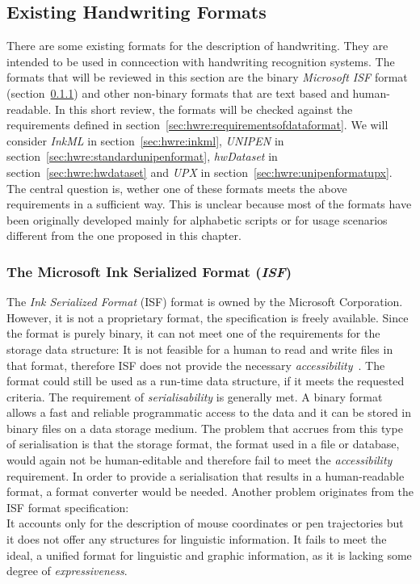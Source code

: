 

\subsection{Existing Handwriting Formats}
\label{sec:hwre:existingformats}

There are some existing formats for the description of handwriting.
They are intended to be used in conncection with handwriting recognition systems.
The formats that will be reviewed in this section are the 
binary \emph{Microsoft ISF} format (section~\ref{sec:hwre:msisfformat})
and other non-binary formats that are text based and human-readable.
In this short review, the formats will be checked against the 
requirements defined in section~\ref{sec:hwre:requirementsofdataformat}. 
We will consider 
\emph{InkML} in section~\ref{sec:hwre:inkml}, 
\emph{UNIPEN} in section~\ref{sec:hwre:standardunipenformat}, 
\emph{hwDataset} in section~\ref{sec:hwre:hwdataset} and 
\emph{UPX} in section~\ref{sec:hwre:unipenformatupx}.
The central question is, wether one of these formats meets the above requirements in 
a sufficient way. This is unclear because most of the formats have been 
originally developed mainly for alphabetic scripts or for usage scenarios 
different from the one proposed in this chapter.

\subsubsection{The Microsoft Ink Serialized Format (\emph{ISF})}
\label{sec:hwre:msisfformat}

The \emph{Ink Serialized Format} (ISF) format is owned by the 
Microsoft Corporation. However, it is not a proprietary format, the 
specification is freely available. Since the format is purely binary, 
it can not meet one of the requirements for the storage data structure:
It is not feasible for a human to read and write files in that format,
therefore ISF does not provide the necessary 
\emph{accessibility}~. The format could still be used 
as a run-time data structure, if it meets the requested criteria.
The requirement of \emph{serialisability} is generally met. A binary format 
allows a fast and reliable programmatic access to the data and it can be stored
in binary files on a data storage medium. The problem that accrues from this 
type of serialisation is that the storage format, the format used in a file or 
database, would again not be human-editable and therefore fail to meet the 
\emph{accessibility} requirement.
In order to provide a serialisation that results in a human-readable format, 
a format converter would be needed. Another problem originates from the 
ISF format specification: \\
It accounts only for the description of mouse coordinates or pen trajectories 
but it does not offer any structures for linguistic information.
It fails to meet the ideal, a unified format for linguistic and graphic 
information, as it is lacking some degree of \emph{expressiveness}.

